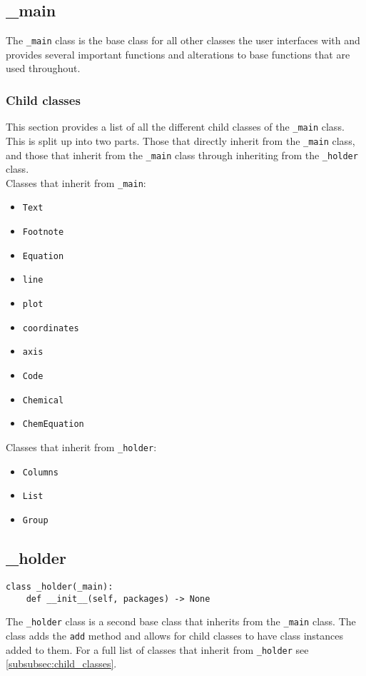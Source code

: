 \documentclass{article}
\begin{document}
\subsection{\_main}\label{subsec:_main}
The \verb|_main| class is the base class for all other classes the user interfaces with and provides several important functions and alterations to base functions that are used throughout.
\subsubsection{Child classes}\label{subsubsec:child_classes}
This section provides a list of all the different child classes of the \verb|_main| class. This is split up into two parts. Those that directly inherit from the \verb|_main| class, and those that inherit from the \verb|_main| class through inheriting from the \verb|_holder| class.\\
Classes that inherit from \verb|_main|:\begin{multicols}{2}\begin{itemize}
\item \verb|Text|
\item \verb|Footnote|
\item \verb|Equation|
\item \verb|line|
\item \verb|plot|
\item \verb|coordinates|
\item \verb|axis|
\item \verb|Code|
\item \verb|Chemical|
\item \verb|ChemEquation|
\end{itemize}
\end{multicols}Classes that inherit from \verb|_holder|:\begin{multicols}{2}\begin{itemize}
\item \verb|Columns|
\item \verb|List|
\item \verb|Group|
\end{itemize}
\end{multicols}
\subsection{\_holder}\label{subsec:_holder}
\begin{verbatim}
class _holder(_main):
	def __init__(self, packages) -> None
\end{verbatim}
The \verb|_holder| class is a second base class that inherits from the \verb|_main| class. The class adds the \verb|add| method and allows for child classes to have class instances added to them. For a full list of classes that inherit from \verb|_holder| see \autoref{subsubsec:child_classes}.
\end{document}
